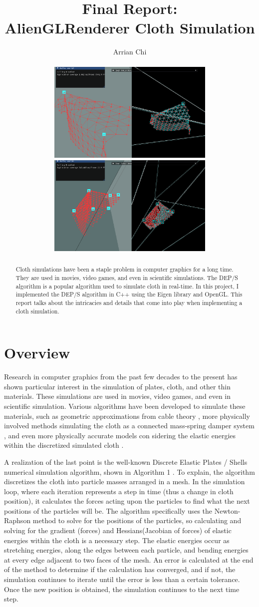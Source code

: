 \documentclass[letterpaper, 10 pt, conference]{ieeeconf}  %
\title{\LARGE \bf
Final Report: \\ 
\Large AlienGLRenderer Cloth Simulation
}
\author{Arrian Chi%
\\
\\
\includegraphics[width=8cm]{cloth1.PNG} \> \includegraphics[width=8cm]{cloth2.PNG} 
}
\begin{document}


\maketitle
\thispagestyle{empty}
\pagestyle{empty}



\begin{abstract}

Cloth simulations have been a staple problem in computer graphics for a long time. They are used in movies, video games, and even in scientific simulations. The DEP/S algorithm is a popular algorithm used to simulate cloth in real-time. In this project, I implemented the DEP/S algorithm in C++ using the Eigen library and OpenGL. This report talks about the intricacies and details that come into play when implementing a cloth simulation. 

\end{abstract}
\section{Overview}

Research in computer graphics from the past few decades to the present \cite{baraff1998large} \cite{Grinspun2003discrete} \cite{Tamstorf2013discrete} has shown particular interest in the simulation of plates, cloth, and other thin materials. These simulations are used in movies, video games, and even in scientific simulation. Various algorithms have been developed to simulate these materials, such as geometric approximations from cable theory \cite{weil1986synthesis}, more physically involved methods simulating the cloth as a connected mass-spring damper system  \cite{provot1995deformation}, and even more physically accurate models con sidering the elastic energies within the discretized simulated cloth \cite{terzopoulos1987elastically}. 

A realization of the last point is the well-known Discrete Elastic Plates / Shells numerical simulation algorithm, shown in Algorithm 1 \cite{jawedlimdiscrete} \cite{baraff1998large}. To explain, the algorithm discretizes the cloth into particle masses arranged in a mesh. In the simulation loop, where each iteration represents a step in time (thus a change in cloth position), it calculates the forces acting upon the particles to find what the next positions of the particles will be. The algorithm specifically uses the Newton-Raphson method to solve for the positions of the particles, so calculating and solving for the gradient (forces) and Hessians(Jacobian of forces) of elastic energies within the cloth is a necessary step. The elastic energies occur as stretching energies, along the edges between each particle, and bending energies at every edge adjacent to two faces of the mesh. An error is calculated at the end of the method to determine if the calculation has converged, and if not, the simulation continues to iterate until the error is less than a certain tolerance. Once the new position is obtained, the simulation continues to the next time step.
\end{document}
